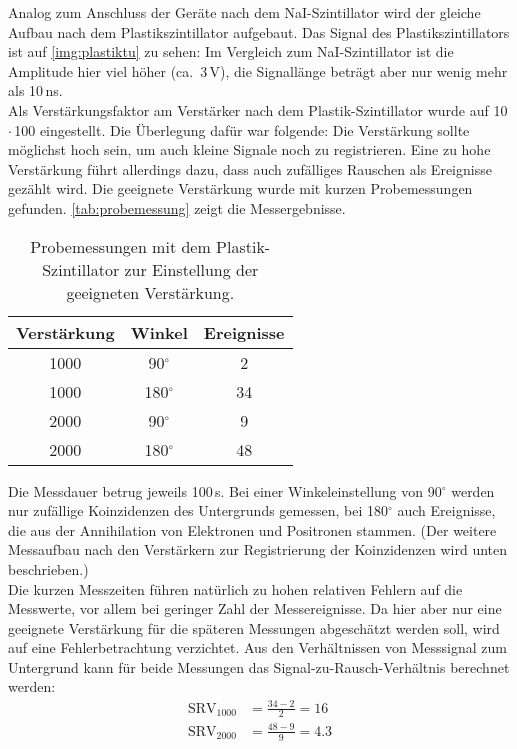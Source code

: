Analog zum Anschluss der Geräte nach dem NaI-Szintillator wird der gleiche Aufbau nach dem Plastikszintillator
aufgebaut. Das Signal des Plastikszintillators ist auf \autoref{img:plastiktu} zu sehen:
Im Vergleich zum NaI-Szintillator ist die Amplitude hier viel höher (ca.~3\,V),
die Signallänge beträgt aber nur wenig mehr als 10\,ns.\\
Als Verstärkungsfaktor am Verstärker nach dem Plastik-Szintillator wurde auf 10\,$\cdot$\,100 eingestellt.
Die Überlegung dafür war folgende: Die Verstärkung sollte möglichst hoch sein,
um auch kleine Signale noch zu registrieren.
Eine zu hohe Verstärkung führt allerdings dazu, dass auch zufälliges Rauschen als Ereignisse gezählt wird.
Die geeignete Verstärkung wurde mit kurzen Probemessungen gefunden.
\autoref{tab:probemessung} zeigt die Messergebnisse.
\begin{table}[H]
\caption{Probemessungen mit dem Plastik-Szintillator zur Einstellung der geeigneten Verstärkung.}
\begin{center}
\begin{tabular}{|c|c|c|}
  \hline
  Verstärkung & Winkel & Ereignisse \\ \hline
  1000 & 90$^\circ$ & 2  \\ \hline
  1000 & 180$^\circ$ & 34  \\ \hline
  2000 & 90$^\circ$ & 9  \\ \hline
  2000 & 180$^\circ$ & 48  \\ \hline
\end{tabular}
\end{center}
\label{tab:probemessung}
\end{table}
Die Messdauer betrug jeweils 100\,s.
Bei einer Winkeleinstellung von 90$^\circ$ werden nur zufällige Koinzidenzen
des Untergrunds gemessen, bei 180$^\circ$ auch Ereignisse, die aus der Annihilation von Elektronen
und Positronen stammen.
(Der weitere Messaufbau nach den Verstärkern zur Registrierung der Koinzidenzen wird unten beschrieben.)\\
Die kurzen Messzeiten führen natürlich zu hohen relativen Fehlern auf die Messwerte,
vor allem bei geringer Zahl der Messereignisse.
Da hier aber nur eine geeignete Verstärkung für die späteren Messungen abgeschätzt werden soll,
wird auf eine Fehlerbetrachtung verzichtet.
Aus den Verhältnissen von Messsignal zum Untergrund kann für beide Messungen das
Signal-zu-Rausch-Verhältnis berechnet werden:
\begin{equation}
  \begin{split}
  \text{SRV}_{1000} & = \frac{34-2}{2} = 16 \\
   \text{SRV}_{2000} & = \frac{48-9}{9} = 4.3
  \end{split}
\end{equation}
